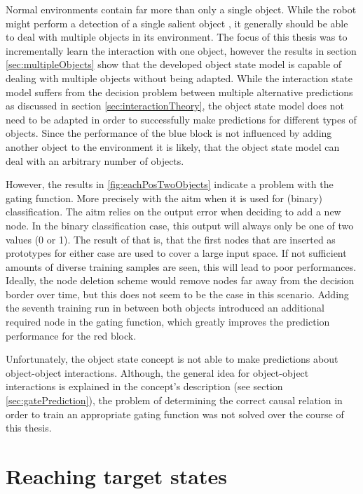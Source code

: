 Normal environments contain far more than only a single object. While the robot might perform a detection of a single salient object \cite{salient}, it generally should be able to deal with multiple objects in its environment. The focus of this thesis was to incrementally learn the interaction with one object, however the results in section \ref{sec:multipleObjects} show that the developed object state model is capable of dealing with multiple objects without being adapted.
While the interaction state model suffers from the decision problem between multiple alternative predictions as discussed in section \ref{sec:interactionTheory}, the object state model does not need to be adapted in order to successfully make predictions for different types of objects. Since the performance of the blue block is not influenced by adding another object to the environment it is likely, that the object state model can deal with an arbitrary number of objects.

However, the results in \ref{fig:eachPosTwoObjects} indicate a problem with the gating function. More precisely with the \gls{aitm} when it is used for (binary) classification. The \gls{aitm} relies on the output error when deciding to add a new node. In the binary classification case, this output will always only be one of two values (0 or 1). The result of that is, that the first nodes that are inserted as prototypes for either case are used to cover a large input space. If not sufficient amounts of diverse training samples are seen, this will lead to poor performances. Ideally, the node deletion scheme would remove nodes far away from the decision border over time, but this does not seem to be the case in this scenario. Adding the seventh training run in between both objects introduced an additional required node in the gating function, which greatly improves the prediction performance for the red block.

Unfortunately, the object state concept is not able to make predictions about object-object interactions. Although, the general idea for object-object interactions is explained in the concept's description (see section \ref{sec:gatePrediction}), the problem of determining the correct causal relation in order to train an appropriate gating function was not solved over the course of this thesis.

\section{Reaching target states}


